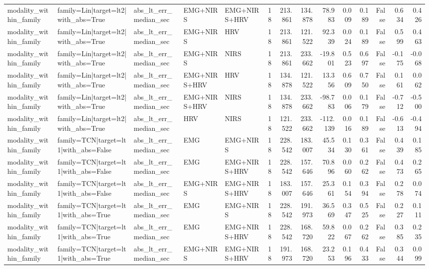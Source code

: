 \begin{table}
\begin{tabular}{lllllrrrrrrrrr}
modality_within_family & family=Lin|target=lt2|with_abs=True & abs_lt_err_median_sec & EMG+NIRS & EMG+NIRS+HRV & 18 & 213.861 & 134.878 & 78.983 & 0.009 & 0.189 & False & 0.634 & 0.426 \\
modality_within_family & family=Lin|target=lt2|with_abs=True & abs_lt_err_median_sec & EMG+NIRS & HRV & 18 & 213.861 & 121.522 & 92.339 & 0.024 & 0.189 & False & 0.599 & 0.463 \\
modality_within_family & family=Lin|target=lt2|with_abs=True & abs_lt_err_median_sec & EMG+NIRS & NIRS & 18 & 213.861 & 233.662 & -19.801 & 0.523 & 0.697 & False & -0.175 & -0.068 \\
modality_within_family & family=Lin|target=lt2|with_abs=True & abs_lt_err_median_sec & EMG+NIRS+HRV & HRV & 18 & 134.878 & 121.522 & 13.356 & 0.609 & 0.750 & False & 0.161 & 0.062 \\
modality_within_family & family=Lin|target=lt2|with_abs=True & abs_lt_err_median_sec & EMG+NIRS+HRV & NIRS & 18 & 134.878 & 233.662 & -98.783 & 0.006 & 0.179 & False & -0.712 & -0.500 \\
modality_within_family & family=Lin|target=lt2|with_abs=True & abs_lt_err_median_sec & HRV & NIRS & 18 & 121.522 & 233.662 & -112.139 & 0.016 & 0.189 & False & -0.613 & -0.494 \\
modality_within_family & family=TCN|target=lt1|with_abs=False & abs_lt_err_median_sec & EMG & EMG+NIRS & 18 & 228.542 & 183.007 & 45.534 & 0.130 & 0.361 & False & 0.439 & 0.185 \\
modality_within_family & family=TCN|target=lt1|with_abs=False & abs_lt_err_median_sec & EMG & EMG+NIRS+HRV & 18 & 228.542 & 157.646 & 70.896 & 0.060 & 0.262 & False & 0.473 & 0.265 \\
modality_within_family & family=TCN|target=lt1|with_abs=False & abs_lt_err_median_sec & EMG+NIRS & EMG+NIRS+HRV & 18 & 183.007 & 157.646 & 25.361 & 0.154 & 0.394 & False & 0.278 & 0.074 \\
modality_within_family & family=TCN|target=lt1|with_abs=True & abs_lt_err_median_sec & EMG & EMG+NIRS & 18 & 228.542 & 191.973 & 36.569 & 0.347 & 0.525 & False & 0.227 & 0.111 \\
modality_within_family & family=TCN|target=lt1|with_abs=True & abs_lt_err_median_sec & EMG & EMG+NIRS+HRV & 18 & 228.542 & 168.720 & 59.822 & 0.067 & 0.262 & False & 0.385 & 0.235 \\
modality_within_family & family=TCN|target=lt1|with_abs=True & abs_lt_err_median_sec & EMG+NIRS & EMG+NIRS+HRV & 18 & 191.973 & 168.720 & 23.253 & 0.196 & 0.433 & False & 0.344 & 0.099 \\

\end{tabular}
\end{table}
